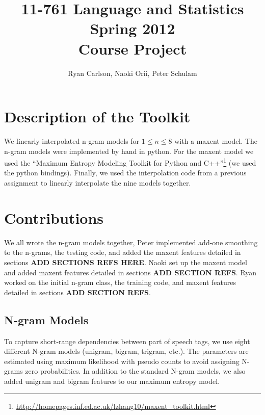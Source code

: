 \documentclass[11pt]{article}
\begin{document}
 

\title{{11-761 Language and Statistics\\Spring 2012\\Course Project}}
\author{Ryan Carlson, Naoki Orii, Peter Schulam}
\maketitle

\section{Description of the Toolkit}

We linearly interpolated n-gram models for $1 \le n \le 8$ with a maxent model. The n-gram models were implemented by hand in python. For the maxent model we used the ``Maximum Entropy Modeling Toolkit for Python and C++''\footnote{\url{http://homepages.inf.ed.ac.uk/lzhang10/maxent_toolkit.html}} (we used the python bindings). Finally, we used the interpolation code from a previous assignment to linearly interpolate the nine models together.

\section{Contributions}

We all wrote the n-gram models together, Peter implemented add-one smoothing to the n-grams, the testing code, and added the maxent features detailed in sections \textbf{ADD SECTIONS REFS HERE}. Naoki set up the maxent model and added maxent features detailed in sections \textbf{ADD SECTION REFS}. Ryan worked on the initial n-gram class, the training code, and maxent features detailed in sections \textbf{ADD SECTION REFS}.

\subsection{N-gram Models}

To capture short-range dependencies between part of speech tags, we use
eight different N-gram models (unigram, bigram, trigram, etc.). The
parameters are estimated using maximum likelihood with pseudo counts to
avoid assigning N-grams zero probabilities. In addition to the standard
N-gram models, we also added unigram and bigram features to our maximum
entropy model. 
\end{document}
